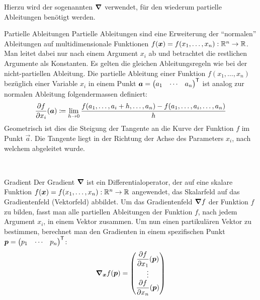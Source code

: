 \begin{appendices}
Hierzu wird der sogenannten  $\bm{\nabla}$ verwendet,
für den wiederum partielle Ableitungen benötigt werden.
\para{}
\begin{defbox}{Partielle Ableitungen}\label{ref:partielle_ableitungen}
  Partielle Ableitungen sind eine Erweiterung der ``normalen'' Ableitungen auf
  multidimensionale Funktionen $f(\bm{x}) = f(x_1,\ldots,x_n): \mathbb{R}^n \to \mathbb{R}$.
  Man leitet dabei nur nach einem Argument $x_i$ ab und betrachtet die restlichen Argumente als Konstanten.
  Es gelten die gleichen Ableitungsregeln wie bei der nicht-partiellen Ableitung.
  Die partielle Ableitung einer Funktion $f(x_1,\ldots,x_n)$ bezüglich einer
  Variable $x_i$ in einem Punkt $\bm{a} = \begin{pmatrix} a_1 & \cdots & a_n \end{pmatrix}^{\mathsf{T}}$
  ist analog zur normalen Ableitung folgendermassen definiert:
  \begin{equation*}
    \frac{\partial f}{\partial x_i}(\bm{a}) \coloneqq \lim_{h \to 0} \frac{f(a_1,\ldots,a_i + h,\ldots,a_n)-f(a_1,\ldots,a_i,\ldots,a_n)}{h}
  \end{equation*}
  Geometrisch ist dies die Steigung der Tangente an die Kurve der Funktion $f$ im Punkt
  $\vec{a}$. Die Tangente liegt in der Richtung der Achse des Parameters $x_i$,
  nach welchem abgeleitet wurde.
\end{defbox}
\\
\begin{defbox}{Gradient}
  Der Gradient $\bm{\nabla}$ ist ein Differentialoperator, der auf eine
  skalare Funktion $f(\bm{x}) = f(x_1,\ldots,x_n): \mathbb{R}^n \to \mathbb{R}$
  angewendet, das Skalarfeld auf das Gradientenfeld (Vektorfeld) abbildet.
  Um das Gradientenfeld $\bm{\nabla}f$ der Funktion $f$ zu bilden, fasst man alle
  partiellen Ableitungen der Funktion $f$, nach jedem Argument $x_i$, in einem
  Vektor zusammen.
  Um nun einen partikulären Vektor zu bestimmen, berechnet man den Gradienten in einem spezifischen Punkt
  $\bm{p} = \begin{pmatrix} p_1 & \cdots & p_n \end{pmatrix}^{\mathsf{T}}$:
  \begin{equation*}
    \bm{\nabla}_{\bm{x}} f(\bm{p}) =
    \begin{pmatrix}
      \displaystyle\frac{\partial f}{\partial x_1}(\bm{p}) \\
      \vdots \\
      \displaystyle\frac{\partial f}{\partial x_n}(\bm{p}) \\
    \end{pmatrix}
  \end{equation*}


\end{defbox}
\end{appendices}
